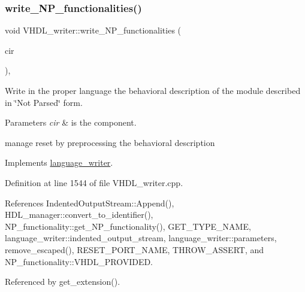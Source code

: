 \subsubsection{\texorpdfstring{write\+\_\+\+N\+P\+\_\+functionalities()}{write\_NP\_functionalities()}}
{\footnotesize\ttfamily void V\+H\+D\+L\+\_\+writer\+::write\+\_\+\+N\+P\+\_\+functionalities (\begin{DoxyParamCaption}\item[{const \hyperlink{structural__objects_8hpp_a8ea5f8cc50ab8f4c31e2751074ff60b2}{structural\+\_\+object\+Ref} \&}]{cir }\end{DoxyParamCaption})\hspace{0.3cm}{\ttfamily [override]}, {\ttfamily [virtual]}}



Write in the proper language the behavioral description of the module described in \char`\"{}\+Not Parsed\char`\"{} form. 


\begin{DoxyParams}{Parameters}
{\em cir} & is the component. \\
\hline
\end{DoxyParams}
manage reset by preprocessing the behavioral description 

Implements \hyperlink{classlanguage__writer_a75a800dc2e7afbecf76f1acaae82b6ce}{language\+\_\+writer}.



Definition at line 1544 of file V\+H\+D\+L\+\_\+writer.\+cpp.



References Indented\+Output\+Stream\+::\+Append(), H\+D\+L\+\_\+manager\+::convert\+\_\+to\+\_\+identifier(), N\+P\+\_\+functionality\+::get\+\_\+\+N\+P\+\_\+functionality(), G\+E\+T\+\_\+\+T\+Y\+P\+E\+\_\+\+N\+A\+ME, language\+\_\+writer\+::indented\+\_\+output\+\_\+stream, language\+\_\+writer\+::parameters, remove\+\_\+escaped(), R\+E\+S\+E\+T\+\_\+\+P\+O\+R\+T\+\_\+\+N\+A\+ME, T\+H\+R\+O\+W\+\_\+\+A\+S\+S\+E\+RT, and N\+P\+\_\+functionality\+::\+V\+H\+D\+L\+\_\+\+P\+R\+O\+V\+I\+D\+ED.



Referenced by get\+\_\+extension().

